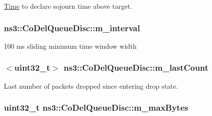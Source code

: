 \hyperlink{classns3_1_1Time}{Time} to declare sojourn time above target. 

\subsubsection[{\texorpdfstring{m\+\_\+interval}{m_interval}}]{ ns3\+::\+Co\+Del\+Queue\+Disc\+::m\+\_\+interval\hspace{0.3cm}{\ttfamily [private]}}\hypertarget{classns3_1_1CoDelQueueDisc_af347ae81576ce27b3f06d015f9422ec1}{}\label{classns3_1_1CoDelQueueDisc_af347ae81576ce27b3f06d015f9422ec1}


100 ms sliding minimum time window width 

\subsubsection[{\texorpdfstring{m\+\_\+last\+Count}{m_lastCount}}]{$<$uint32\+\_\+t$>$ ns3\+::\+Co\+Del\+Queue\+Disc\+::m\+\_\+last\+Count\hspace{0.3cm}{\ttfamily [private]}}\hypertarget{classns3_1_1CoDelQueueDisc_aa7cd76433e40f7abd08d724b97732c3d}{}\label{classns3_1_1CoDelQueueDisc_aa7cd76433e40f7abd08d724b97732c3d}


Last number of packets dropped since entering drop state. 

\subsubsection[{\texorpdfstring{m\+\_\+max\+Bytes}{m_maxBytes}}]{\setlength{\rightskip}{0pt plus 5cm}uint32\+\_\+t ns3\+::\+Co\+Del\+Queue\+Disc\+::m\+\_\+max\+Bytes\hspace{0.3cm}{\ttfamily [private]}}\hypertarget{classns3_1_1CoDelQueueDisc_aaedc40bf84fcee585be0e9cf3c98f33d}{}\label{classns3_1_1CoDelQueueDisc_aaedc40bf84fcee585be0e9cf3c98f33d}


